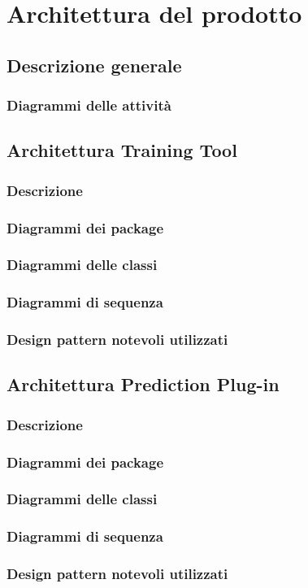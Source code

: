\section{Architettura del prodotto}

\subsection{Descrizione generale}

\subsubsection{Diagrammi delle attività}

\subsection{Architettura Training Tool}

\subsubsection{Descrizione}

\subsubsection{Diagrammi dei package}

\subsubsection{Diagrammi delle classi}

\subsubsection{Diagrammi di sequenza}

\subsubsection{Design pattern notevoli utilizzati}

\subsection{Architettura Prediction Plug-in}

\subsubsection{Descrizione}

\subsubsection{Diagrammi dei package}

\subsubsection{Diagrammi delle classi}

\subsubsection{Diagrammi di sequenza}

\subsubsection{Design pattern notevoli utilizzati}

